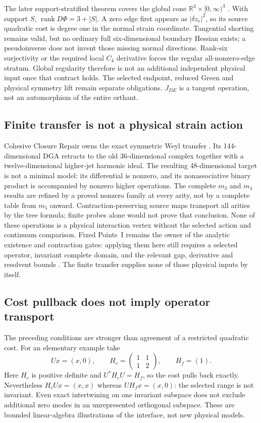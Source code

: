 \documentclass[11pt]{article}
\begin{document}
The later support-stratified theorem covers the global cone
$\mathbb R^3\times[0,\infty)^3$ \cite{FrozenSupport}. With support $S$,
$\operatorname{rank}D\Phi=3+|S|$. A zero edge first appears as
$|\delta z_e|^2$, so its source quadratic cost is degree one in the normal
strain coordinate. Tangential shorting remains valid, but no ordinary full
six-dimensional boundary Hessian exists; a pseudoinverse does not invent
those missing normal directions. Rank-six surjectivity or the required local
$C_4$ derivative forces the regular all-nonzero-edge stratum. Global
regularity therefore is not an additional independent physical input once
that contract holds. The selected endpoint, reduced Green and physical
symmetry lift remain separate obligations. $J_{DE}$ is a tangent operation,
not an automorphism of the entire orthant.

\subsection{Finite transfer is not a physical strain action}
\label{sec:consumer-transfer}
Cohesive Closure Repair owns the exact symmetric Weyl transfer
\cite{CohesiveCurrent,FrozenMThree,FrozenMFour,FrozenHigher,FrozenNaturality}.
Its 144-dimensional DGA retracts to the old 36-dimensional complex together
with a twelve-dimensional higher-jet harmonic ideal. The resulting
48-dimensional target is not a minimal model: its differential is nonzero,
and its nonassociative binary product is accompanied by nonzero higher
operations. The complete $m_3$ and $m_4$ results are refined by a proved
nonzero family at every arity, not by a complete table from $m_5$ onward.
Contraction-preserving source maps transport all arities by the tree formula;
finite probes alone would not prove that conclusion. None of these
operations is a physical interaction vertex without the selected action and
continuum comparison. Fixed Points~I remains the owner of the analytic
existence and contraction gates: applying them here still requires a selected
operator, invariant complete domain, and the relevant gap, derivative and
resolvent bounds \cite{FixedPointsCurrent}. The finite transfer supplies none
of those physical inputs by itself.

\subsection{Cost pullback does not imply operator transport}
\label{sec:cost-versus-intertwiner}
The preceding conditions are stronger than agreement of a restricted
quadratic cost. For an elementary example take
\[
 Ux=(x,0),\qquad
 H_c=\begin{pmatrix}1&1\\1&2\end{pmatrix},\qquad H_f=(1).
\]
Here $H_c$ is positive definite and $U^*H_cU=H_f$, so the cost pulls back
exactly. Nevertheless $H_cUx=(x,x)$ whereas $UH_fx=(x,0)$: the selected
range is not invariant. Even exact intertwining on one invariant subspace
does not exclude additional zero modes in an unrepresented orthogonal
subspace. These are bounded linear-algebra illustrations of the interface,
not new physical models.
\end{document}
